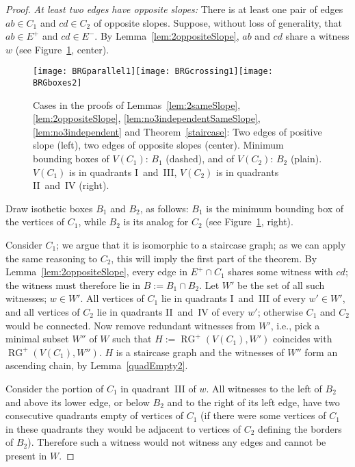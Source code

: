 \documentclass{llncs}
\DeclareMathOperator{\RG}{RG} \DeclareMathOperator{\RIG}{RIG} \DeclareMathOperator{\MNG}{MNG} \DeclareMathOperator{\GG}{GG} \DeclareMathOperator{\DG}{DG} \DeclareMathOperator{\WRG}{WRG}
\begin{document}
\begin{proof}
\noindent\emph{At least two edges have opposite slopes:}
There is at least one pair of edges $ab \in C_1$ and $cd \in C_2$ of opposite slopes.
Suppose, without loss of generality, that $ab \in E^+$ and $cd \in E^-$.
By Lemma~\ref{lem:2oppositeSlope}, $ab$ and $cd$ share a witness $w$
(see Figure~\ref{RGcrossing1}, center).
\begin{figure}[t]
  \centering
  \texttt{[image: BRGparallel1]}\hspace*{0.03\linewidth}\texttt{[image: BRGcrossing1]}\hspace*{0.03\linewidth}\texttt{[image: BRGboxes2]}
  \caption{Cases in the proofs of Lemmas~\ref{lem:2sameSlope},
    \ref{lem:2oppositeSlope},
    \ref{lem:no3independentSameSlope}, \ref{lem:no3independent} and
    Theorem~\ref{staircase}: Two edges of positive slope (left), two
    edges of opposite slopes (center). Minimum bounding boxes of $V(C_1)$: $B_1$ (dashed),
    and of $V(C_2)$: $B_2$ (plain). $V(C_1)$ is in quadrants I~and~III, $V(C_2)$ is in quadrants II~and~IV (right).}
    \label{RGcrossing1}
\end{figure}



Draw isothetic boxes $B_1$ and $B_2$, as follows:
$B_1$ is the minimum bounding box of the vertices of $C_1$, while
$B_2$ is its analog for $C_2$ (see Figure~\ref{RGcrossing1}, right).


Consider $C_1$; we argue that it is isomorphic to a staircase graph;
as we can apply the same reasoning to $C_2$, this will imply the first
part of the 
theorem.  By Lemma~\ref{lem:2oppositeSlope}, every edge in $E^+ \cap C_1$ shares some witness with $cd$;
the witness must therefore lie in $B:=B_1 \cap B_2$.  Let $W'$ be the
set of all such witnesses; $w \in W'$.  All vertices of $C_1$ lie in
quadrants I~and~III of every $w' \in W'$, and all vertices of $C_2$
lie in quadrants II~and~IV of every $w'$; otherwise $C_1$ and $C_2$
would be connected.  Now remove redundant witnesses from $W'$, i.e.,
pick a minimal subset $W''$ of $W$ such that $H:=\RG^+(V(C_1),W')$
coincides with $\RG^+(V(C_1),W'')$.  $H$ is a staircase graph and the
witnesses of $W''$ form an ascending chain, by Lemma~\ref{quadEmpty2}.


Consider the portion of $C_1$ in quadrant~III of $w$.  All witnesses
to the left of $B_2$ and above its lower edge, or below $B_2$ and to
the right of its left edge, have two consecutive quadrants empty of
vertices of $C_1$ (if there were some vertices of $C_1$ in these
quadrants they would be adjacent to vertices of $C_2$ defining the
borders of $B_2$).  Therefore such a witness would not witness any edges
and cannot be present in $W$.  


\end{proof}
\end{document}
